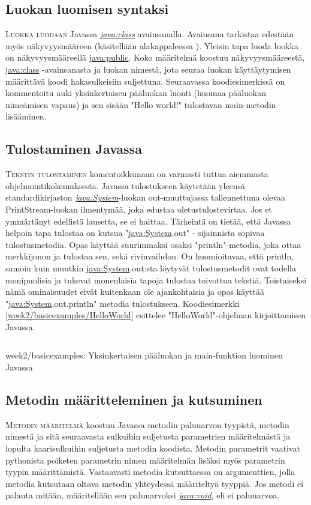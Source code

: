 \documentclass[openany]{book}
\newcommand{\newthought}[1]{\smallskip\textsc{#1}}
\newcommand{\java}[1]{\underline{\gls{java:#1}}}
\newcommand{\newjava}[1]{\textit{\java{#1}}}
\newcommand{\code}[3]{
	\begin{listing}
		\linespread{0.85}
		\inputminted{java}{OhjelmointiopasEsimerkit/src/#1/#2.java}
		\caption{#1: #3}
		\label{#1/#2}
	\end{listing}
}
\begin{document}
\subsection{Luokan luomisen syntaksi}
\label{luokka}

\newthought{Luokka luodaan} Javassa \newjava{class} avainsanalla. Avainsana tarkistaa edestään
myös näkyvyysmääreen (käsitellään alakappaleessa ). Yleisin tapa luoda
luokka on näkyvyysmääreellä \java{public}. Koko määritelmä koostuu näkyvyysmääreestä,
\java{class} -avainsanasta ja luokan nimestä, jota seuraa luokan käyttäytymisen määrittävä koodi
hakasulkeisiin suljettuna. Seuraavassa koodiesimerkissä on kommentoitu auki yksinkertaisen
pääluokan luonti (huomaa pääluokan nimeämisen vapaus) ja sen sisään "Hello world!" tulostavan
main-metodin lisääminen.

\subsection{Tulostaminen Javassa}
\label{print}

\newthought{Tekstin tulostaminen} komentoikkunaan on varmasti tuttua aiemmasta
ohjelmointikokemuksesta. Javassa tulostukseen käytetään yleensä standardikirjaston 
\newjava{System}-luokan out-muuttujassa tallennettuna olevaa PrintStream-luokan ilmentymää, joka
edustaa oletustulostevirtaa. Jos et ymmärtänyt edellistä lausetta, se ei haittaa. Tärkeintä on
tietää, että Javassa helpoin tapa tulostaa on kutsua "\java{System}.out" - sijainnista sopivaa
tulostusmetodia. Opas käyttää suurimmaksi osaksi "println"-metodia, joka ottaa merkkijonon ja
tulostaa sen, sekä rivinvaihdon. On huomioitavaa, että println, samoin kuin muutkin
\java{System}.out:sta löytyvät tulostusmetodit ovat todella monipuolisia ja tukevat monenlaisia
tapoja tulostaa toivottua tekstiä. Toistaiseksi nämä ominaisuudet eivät kuitenkaan ole
ajankohtaisia ja opas käyttää "\java{System}.out.println" metodia tulostukseen. Koodiesimerkki
\ref{week2/basicexamples/HelloWorld} esittelee "HelloWorld"-ohjelman kirjoittamisen Javassa.

\code{week2/basicexamples}{HelloWorld}{Yksinkertaisen pääluokan ja main-funktion luominen Javassa}

\subsection{Metodin määritteleminen ja kutsuminen}
\label{metodi}

\newthought{Metodin määritelmä} koostuu Javassa metodin paluuarvon tyypistä, metodin nimestä
ja sitä seuraavasta sulkuihin suljetusta parametrien määritelmästä ja lopulta kaarisulkuihin
suljetusta metodin koodista. Metodin parametrit vaativat pythonista poiketen parametrin nimen
määritelmän lisäksi myös parametrin tyypin määrittämistä. Vastaavasti metodia kutsuttaessa on
argumenttien, jolla metodia kutsutaan oltava metodin yhteydessä määriteltyä tyyppiä. Jos metodi
ei palauta mitään, määritellään sen paluuarvoksi \newjava{void}, eli ei paluuarvoa.
\end{document}
